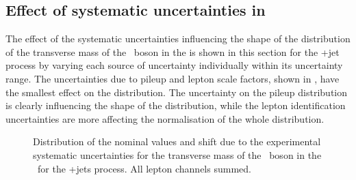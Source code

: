 \subsection{Effect of systematic uncertainties in \WZCR}
\label{sec:MTW}
The effect of the systematic uncertainties influencing the shape of the distribution of the transverse mass of the \PW\ boson in the \WZCR is shown in this section for the \WZ+jet process by varying each source of uncertainty individually within its uncertainty range.  The uncertainties due to pileup and lepton scale factors, shown in , have the smallest effect on the distribution. The uncertainty on the pileup distribution is clearly influencing the shape of the distribution, while the lepton identification uncertainties are more affecting the normalisation of the whole distribution. 
\begin{figure}[htbp] 
	\centering 
	\caption{Distribution of the nominal values and shift due to the experimental systematic uncertainties for the transverse mass of the \PW\ boson in the \WZCR\ for the \WZ+jets process. All lepton channels summed.}
\label{fig:shiftMTW1}
\end{figure}

